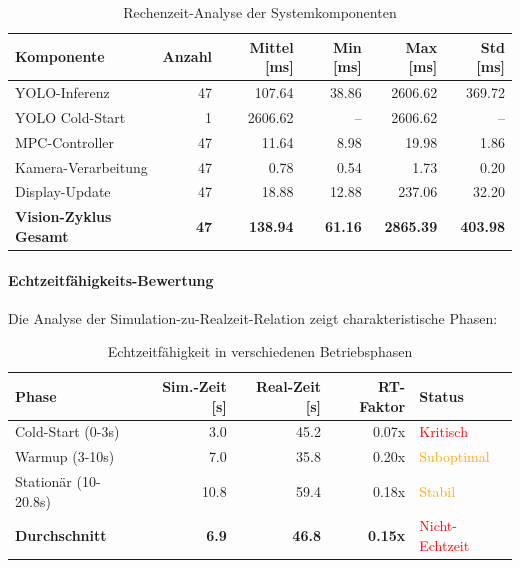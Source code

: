 \begin{table}[htbp]
\centering
\caption{Rechenzeit-Analyse der Systemkomponenten}
\label{tab:performance-analysis}
\begin{tabular}{lrrrrr}
\toprule
\textbf{Komponente} & \textbf{Anzahl} & \textbf{Mittel [ms]} & \textbf{Min [ms]} & \textbf{Max [ms]} & \textbf{Std [ms]}\footnotemark[4] \\
\midrule
YOLO-Inferenz\footnotemark[1] & 47 & 107.64 & 38.86 & 2606.62 & 369.72 \\
YOLO Cold-Start\footnotemark[2] & 1 & 2606.62 & -- & 2606.62 & -- \\
MPC-Controller & 47 & 11.64 & 8.98 & 19.98 & 1.86 \\
Kamera-Verarbeitung & 47 & 0.78 & 0.54 & 1.73 & 0.20 \\
Display-Update & 47 & 18.88 & 12.88 & 237.06 & 32.20 \\
\midrule
\textbf{Vision-Zyklus Gesamt}\footnotemark[3] & \textbf{47} & \textbf{138.94} & \textbf{61.16} & \textbf{2865.39} & \textbf{403.98} \\
\bottomrule
\end{tabular}
\end{table}


\paragraph{Echtzeitfähigkeits-Bewertung}

Die Analyse der Simulation-zu-Realzeit-Relation zeigt charakteristische Phasen:

\begin{table}[htbp]
\centering
\caption{Echtzeitfähigkeit in verschiedenen Betriebsphasen}
\label{tab:realtime-performance}
\begin{tabular}{lrrrl}
\toprule
\textbf{Phase} & \textbf{Sim.-Zeit [s]} & \textbf{Real-Zeit [s]} & \textbf{RT-Faktor} & \textbf{Status} \\
\midrule
Cold-Start (0-3s) & 3.0 & 45.2 & 0.07x & \textcolor{red}{Kritisch} \\
Warmup (3-10s) & 7.0 & 35.8 & 0.20x & \textcolor{orange}{Suboptimal} \\
Stationär (10-20.8s) & 10.8 & 59.4 & 0.18x & \textcolor{orange}{Stabil} \\
\textbf{Durchschnitt} & \textbf{6.9} & \textbf{46.8} & \textbf{0.15x} & \textcolor{red}{Nicht-Echtzeit} \\
\bottomrule
\end{tabular}
\end{table}

